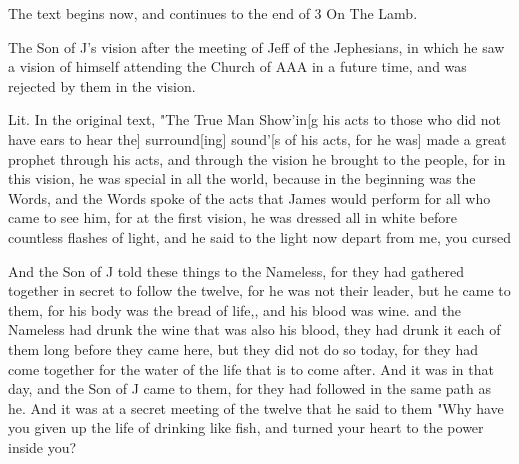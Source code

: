 \Sentence
{ \hX{} }
{ \eX{} }
{
The text begins now, and continues to the end of 3 On The Lamb.
}

\Sentence
{ \hX{} }
{ \eX{} }
{
The Son of J's vision after the meeting of Jeff of the Jephesians, in which he saw a vision of himself attending the Church of AAA in a future time, and was rejected by them in the vision.
}

\Sentence
{ \hX{} }
{ \eX{} }
{
Lit. In the original text, "The True Man Show'in[g his acts to those who did not have ears to hear the] surround[ing] sound'[s of his acts, for he was] made a great prophet through his acts, and through the vision he brought to the people, for in this vision, he was special in all the world, because in the beginning was the Words, and the Words spoke of the acts that James would perform for all who came to see him, for at the first vision, he was dressed all in white before countless flashes of light, and he said to the light  now depart from me, you cursed
}

\Sentence
{ \hX{} }
{ \eX{} }
{
And the Son of J told these things to the Nameless, for they had gathered together in secret to follow the twelve, for he was not their leader, but he came to them, for his body was the bread of life,, and his blood was wine. and the Nameless had drunk the wine that was also his blood, they had drunk it each of them long before they came here, but they did not do so today, for they had come together for the water of the life that is to come after. And it was in that day, and the Son of J came to them, for they had followed in the same path as he. And it was at a secret meeting of the twelve that he said to them "Why have you given up the life of drinking like fish, and turned your heart to the power inside you?
}

